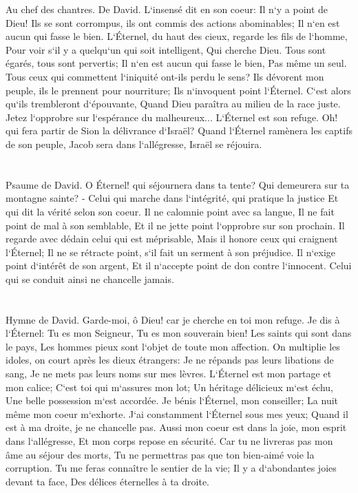 \verse Au chef des chantres. De David. L`insensé dit en son coeur: Il n`y a point de Dieu! Ils se sont corrompus, ils ont commis des actions abominables; Il n`en est aucun qui fasse le bien. 
\verse L`Éternel, du haut des cieux, regarde les fils de l`homme, Pour voir s`il y a quelqu`un qui soit intelligent, Qui cherche Dieu. 
\verse Tous sont égarés, tous sont pervertis; Il n`en est aucun qui fasse le bien, Pas même un seul. 
\verse Tous ceux qui commettent l`iniquité ont-ils perdu le sens? Ils dévorent mon peuple, ils le prennent pour nourriture; Ils n`invoquent point l`Éternel. 
\verse C`est alors qu`ils trembleront d`épouvante, Quand Dieu paraîtra au milieu de la race juste. 
\verse Jetez l`opprobre sur l`espérance du malheureux... L`Éternel est son refuge. 
\verse Oh! qui fera partir de Sion la délivrance d`Israël? Quand l`Éternel ramènera les captifs de son peuple, Jacob sera dans l`allégresse, Israël se réjouira. 

\chapter{}

\verse Psaume de David. O Éternel! qui séjournera dans ta tente? Qui demeurera sur ta montagne sainte? - 
\verse Celui qui marche dans l`intégrité, qui pratique la justice Et qui dit la vérité selon son coeur. 
\verse Il ne calomnie point avec sa langue, Il ne fait point de mal à son semblable, Et il ne jette point l`opprobre sur son prochain. 
\verse Il regarde avec dédain celui qui est méprisable, Mais il honore ceux qui craignent l`Éternel; Il ne se rétracte point, s`il fait un serment à son préjudice. 
\verse Il n`exige point d`intérêt de son argent, Et il n`accepte point de don contre l`innocent. Celui qui se conduit ainsi ne chancelle jamais. 

\chapter{}

\verse Hymne de David. Garde-moi, ô Dieu! car je cherche en toi mon refuge. 
\verse Je dis à l`Éternel: Tu es mon Seigneur, Tu es mon souverain bien! 
\verse Les saints qui sont dans le pays, Les hommes pieux sont l`objet de toute mon affection. 
\verse On multiplie les idoles, on court après les dieux étrangers: Je ne répands pas leurs libations de sang, Je ne mets pas leurs noms sur mes lèvres. 
\verse L`Éternel est mon partage et mon calice; C`est toi qui m`assures mon lot; 
\verse Un héritage délicieux m`est échu, Une belle possession m`est accordée. 
\verse Je bénis l`Éternel, mon conseiller; La nuit même mon coeur m`exhorte. 
\verse J`ai constamment l`Éternel sous mes yeux; Quand il est à ma droite, je ne chancelle pas. 
\verse Aussi mon coeur est dans la joie, mon esprit dans l`allégresse, Et mon corps repose en sécurité. 
\verse Car tu ne livreras pas mon âme au séjour des morts, Tu ne permettras pas que ton bien-aimé voie la corruption. 
\verse Tu me feras connaître le sentier de la vie; Il y a d`abondantes joies devant ta face, Des délices éternelles à ta droite. 

